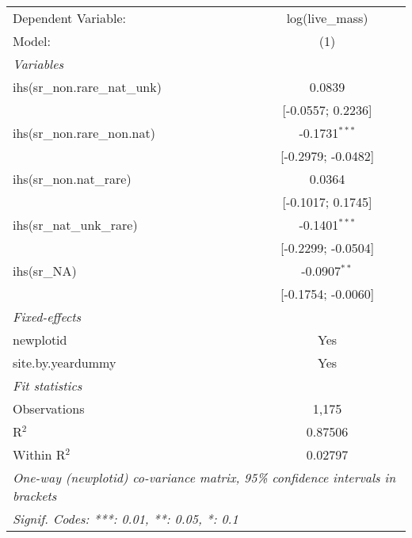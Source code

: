 \begin{tabular}{lc}
\tabularnewline\midrule\midrule
Dependent Variable:&log(live\_mass)\\
Model:&(1)\\
\midrule \emph{Variables}&  \\
ihs(sr\_non.rare\_nat\_unk)&0.0839\\
  &[-0.0557; 0.2236]\\
ihs(sr\_non.rare\_non.nat)&-0.1731$^{***}$\\
  &[-0.2979; -0.0482]\\
ihs(sr\_non.nat\_rare)&0.0364\\
  &[-0.1017; 0.1745]\\
ihs(sr\_nat\_unk\_rare)&-0.1401$^{***}$\\
  &[-0.2299; -0.0504]\\
ihs(sr\_NA)&-0.0907$^{**}$\\
  &[-0.1754; -0.0060]\\
\midrule \emph{Fixed-effects}&  \\
newplotid & Yes\\
site.by.yeardummy & Yes\\
\midrule \emph{Fit statistics}&  \\
Observations & 1,175\\
R$^2$ & 0.87506\\
Within R$^2$ & 0.02797\\
\midrule\midrule\multicolumn{2}{l}{\emph{One-way (newplotid) co-variance matrix, 95\% confidence intervals in brackets}}\\
\multicolumn{2}{l}{\emph{Signif. Codes: ***: 0.01, **: 0.05, *: 0.1}}\\
\end{tabular}


